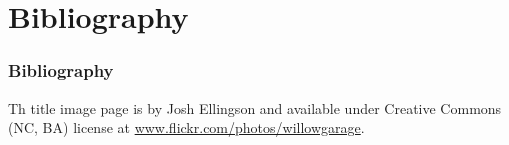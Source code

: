 \documentclass{beamer}
\begin{document}

\section{Bibliography}
\begin{frame}[allowframebreaks]
\frametitle{Bibliography}
\small


\vspace*{0.5cm}
Th title image page is by Josh Ellingson and available under Creative Commons (NC, BA) license at \url{www.flickr.com/photos/willowgarage}.
\end{frame}
\end{document}
